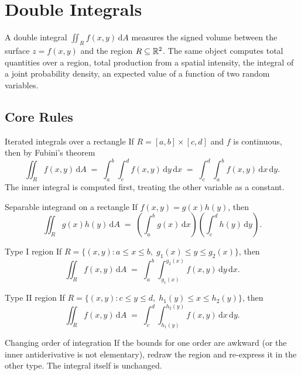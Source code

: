 \chapter{Double Integrals}

A double integral $\iint_R f(x,y)\,\mathrm{d}A$ measures the signed
volume between the surface $z=f(x,y)$ and the region $R\subseteq\mathbb{R}^{2}$.
The same object computes total quantities over a region, total
production from a spatial intensity, the integral of a joint probability
density, an expected value of a function of two random variables.

\section{Core Rules}

\begin{rulebox}{Iterated integrals over a rectangle}
If $R=[a,b]\times[c,d]$ and $f$ is continuous, then by Fubini's theorem
\[
  \iint_{R} f(x,y)\,\mathrm{d}A
    \;=\; \int_{a}^{b}\int_{c}^{d} f(x,y)\,\mathrm{d}y\,\mathrm{d}x
    \;=\; \int_{c}^{d}\int_{a}^{b} f(x,y)\,\mathrm{d}x\,\mathrm{d}y .
\]
The inner integral is computed first, treating the other variable as a
constant.
\end{rulebox}

\begin{rulebox}{Separable integrand on a rectangle}
If $f(x,y)=g(x)h(y)$, then
\[
  \iint_{R} g(x)h(y)\,\mathrm{d}A
    \;=\; \left(\int_{a}^{b} g(x)\,\mathrm{d}x\right)\left(\int_{c}^{d} h(y)\,\mathrm{d}y\right) .
\]
\end{rulebox}

\begin{rulebox}{Type I region}
If $R=\{(x,y): a\le x\le b,\; g_{1}(x)\le y\le g_{2}(x)\}$, then
\[
  \iint_{R} f(x,y)\,\mathrm{d}A
    \;=\; \int_{a}^{b}\int_{g_{1}(x)}^{g_{2}(x)} f(x,y)\,\mathrm{d}y\,\mathrm{d}x .
\]
\end{rulebox}

\begin{rulebox}{Type II region}
If $R=\{(x,y): c\le y\le d,\; h_{1}(y)\le x\le h_{2}(y)\}$, then
\[
  \iint_{R} f(x,y)\,\mathrm{d}A
    \;=\; \int_{c}^{d}\int_{h_{1}(y)}^{h_{2}(y)} f(x,y)\,\mathrm{d}x\,\mathrm{d}y .
\]
\end{rulebox}

\begin{rulebox}{Changing order of integration}
If the bounds for one order are awkward (or the inner antiderivative is
not elementary), redraw the region and re-express it in the other type.
The integral itself is unchanged.
\end{rulebox}

